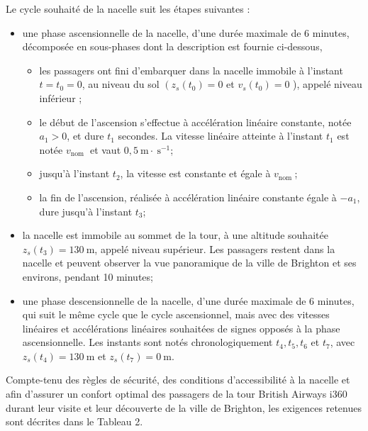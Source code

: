\documentclass[10pt]{article}
\begin{document}
Le cycle souhaité de la nacelle suit les étapes suivantes :

\begin{itemize}
  \item[-] une phase ascensionnelle de la nacelle, d'une durée maximale de 6 minutes, décomposée en sous-phases dont la description est fournie ci-dessous,
  \begin{itemize}
    \item[-] les passagers ont fini d'embarquer dans la nacelle immobile à l'instant $t=t_{0}=0$, au niveau du sol $\left(z_{s}\left(t_{0}\right)=0\right.$ et $v_{s}\left(t_{0}\right)=0$ ), appelé niveau inférieur ;
    \item[-] le début de l'ascension s'effectue à accélération linéaire constante, notée $a_{1}>0$, et dure $t_{1}$ secondes. La vitesse linéaire atteinte à l'instant $t_{1}$ est notée $v_{\text {nom }}$ et vaut $0,5 \mathrm{~m} \cdot \mathrm{~s}^{-1}$;
    \item[-] jusqu'à l'instant $t_{2}$, la vitesse est constante et égale à $v_{\text {nom }}$;
    \item[-] la fin de l'ascension, réalisée à accélération linéaire constante égale à $-a_{1}$, dure jusqu'à l'instant $t_{3}$;
  \end{itemize}
  \item[-] la nacelle est immobile au sommet de la tour, à une altitude souhaitée $z_{s}\left(t_{3}\right)=130 \mathrm{~m}$, appelé niveau supérieur. Les passagers restent dans la nacelle et peuvent observer la vue panoramique de la ville de Brighton et ses environs, pendant 10 minutes;
  \item[-] une phase descensionnelle de la nacelle, d'une durée maximale de 6 minutes, qui suit le même cycle que le cycle ascensionnel, mais avec des vitesses linéaires et accélérations linéaires souhaitées de signes opposés à la phase ascensionnelle. Les instants sont notés chronologiquement $t_{4}, t_{5}, t_{6}$ et $t_{7}$, avec $z_{s}\left(t_{4}\right)=130 \mathrm{~m}$ et $z_{s}\left(t_{7}\right)=0 \mathrm{~m}$.
\end{itemize}

Compte-tenu des règles de sécurité, des conditions d'accessibilité à la nacelle et afin d'assurer un confort optimal des passagers de la tour British Airways i360 durant leur visite et leur découverte de la ville de Brighton, les exigences retenues sont décrites dans le Tableau 2.
\end{document}
